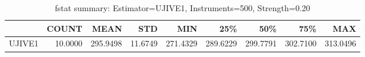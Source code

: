 \begin{table}[ht]
\centering
\caption{fstat summary: Estimator=UJIVE1, Instruments=500, Strength=0.20}
\begin{tabular}{lrrrrrrrr}
\toprule
 & COUNT & MEAN & STD & MIN & 25\% & 50\% & 75\% & MAX \\
\midrule
UJIVE1 & 10.0000 & 295.9498 & 11.6749 & 271.4329 & 289.6229 & 299.7791 & 302.7100 & 313.0496 \\
\bottomrule
\end{tabular}
\end{table}

